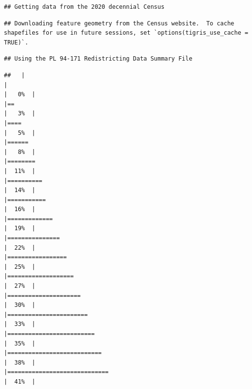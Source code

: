 \documentclass[
]{article}
\begin{document}
\begin{verbatim}
## Getting data from the 2020 decennial Census
\end{verbatim}

\begin{verbatim}
## Downloading feature geometry from the Census website.  To cache shapefiles for use in future sessions, set `options(tigris_use_cache = TRUE)`.
\end{verbatim}

\begin{verbatim}
## Using the PL 94-171 Redistricting Data Summary File
\end{verbatim}

\begin{verbatim}
##   |                                                                              |                                                                      |   0%  |                                                                              |==                                                                    |   3%  |                                                                              |====                                                                  |   5%  |                                                                              |======                                                                |   8%  |                                                                              |========                                                              |  11%  |                                                                              |==========                                                            |  14%  |                                                                              |===========                                                           |  16%  |                                                                              |=============                                                         |  19%  |                                                                              |===============                                                       |  22%  |                                                                              |=================                                                     |  25%  |                                                                              |===================                                                   |  27%  |                                                                              |=====================                                                 |  30%  |                                                                              |=======================                                               |  33%  |                                                                              |=========================                                             |  35%  |                                                                              |===========================                                           |  38%  |                                                                              |=============================                                         |  41%  |          
\end{verbatim}
\end{document}
